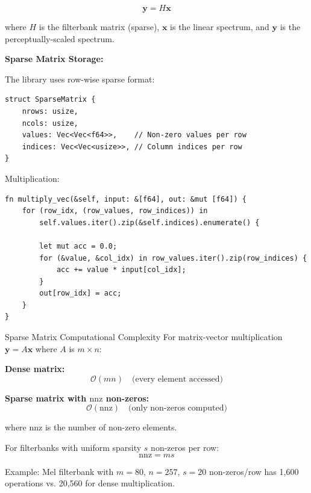 \begin{equation}
  \mathbf{y} = H \mathbf{x}
\end{equation}

where $H$ is the filterbank matrix (sparse), $\mathbf{x}$ is the
linear spectrum, and $\mathbf{y}$ is the perceptually-scaled spectrum.

\textbf{Sparse Matrix Storage:}

The library uses row-wise sparse format:

\begin{lstlisting}[caption={Row-wise sparse matrix storage definition}]
struct SparseMatrix {
    nrows: usize,
    ncols: usize,
    values: Vec<Vec<f64>>,    // Non-zero values per row
    indices: Vec<Vec<usize>>, // Column indices per row
}
\end{lstlisting}

Multiplication:

\begin{lstlisting}[caption={Sparse matrix-vector multiplication}]
fn multiply_vec(&self, input: &[f64], out: &mut [f64]) {
    for (row_idx, (row_values, row_indices)) in
        self.values.iter().zip(&self.indices).enumerate() {

        let mut acc = 0.0;
        for (&value, &col_idx) in row_values.iter().zip(row_indices) {
            acc += value * input[col_idx];
        }
        out[row_idx] = acc;
    }
}
\end{lstlisting}

\begin{concept}{Sparse Matrix Computational Complexity}
  For matrix-vector multiplication $\mathbf{y} = A\mathbf{x}$ where
  $A$ is $m \times n$:

  \textbf{Dense matrix:}
  \begin{equation}
    \mathcal{O}(mn) \quad \text{(every element accessed)}
  \end{equation}

  \textbf{Sparse matrix with $\text{nnz}$ non-zeros:}
  \begin{equation}
    \mathcal{O}(\text{nnz}) \quad \text{(only non-zeros computed)}
  \end{equation}

  where $\text{nnz}$ is the number of non-zero elements.

  For filterbanks with uniform sparsity $s$ non-zeros per row:
  \begin{equation}
    \text{nnz} = ms
  \end{equation}

  Example: Mel filterbank with $m=80$, $n=257$, $s=20$ non-zeros/row
  has 1,600 operations vs. 20,560 for dense multiplication.
\end{concept}

